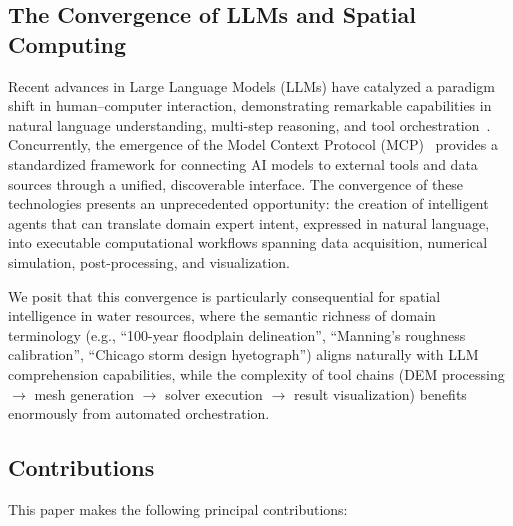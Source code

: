 \documentclass[11pt, a4paper]{article}
\begin{document}
\subsection{The Convergence of LLMs and Spatial Computing}

Recent advances in Large Language Models (LLMs) have catalyzed a paradigm shift in human--computer interaction, demonstrating remarkable capabilities in natural language understanding, multi-step reasoning, and tool orchestration~\cite{openai2023gpt4}. Concurrently, the emergence of the Model Context Protocol (MCP)~\cite{mcp2024} provides a standardized framework for connecting AI models to external tools and data sources through a unified, discoverable interface. The convergence of these technologies presents an unprecedented opportunity: the creation of intelligent agents that can translate domain expert intent, expressed in natural language, into executable computational workflows spanning data acquisition, numerical simulation, post-processing, and visualization.

We posit that this convergence is particularly consequential for spatial intelligence in water resources, where the semantic richness of domain terminology (e.g., ``100-year floodplain delineation'', ``Manning's roughness calibration'', ``Chicago storm design hyetograph'') aligns naturally with LLM comprehension capabilities, while the complexity of tool chains (DEM processing $\to$ mesh generation $\to$ solver execution $\to$ result visualization) benefits enormously from automated orchestration.

\subsection{Contributions}

This paper makes the following principal contributions:
\end{document}
